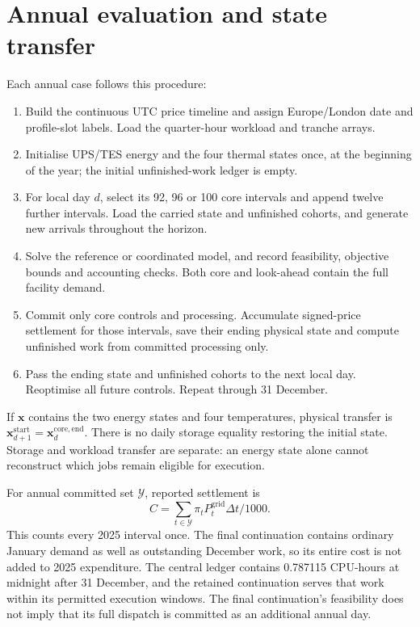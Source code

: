 \section{Annual evaluation and state transfer}
Each annual case follows this procedure:
\begin{enumerate}
\item Build the continuous UTC price timeline and assign Europe/London date and profile-slot labels. Load the quarter-hour workload and tranche arrays.
\item Initialise UPS/TES energy and the four thermal states once, at the beginning of the year; the initial unfinished-work ledger is empty.
\item For local day $d$, select its 92, 96 or 100 core intervals and append twelve further intervals. Load the carried state and unfinished cohorts, and generate new arrivals throughout the horizon.
\item Solve the reference or coordinated model, and record feasibility, objective bounds and accounting checks. Both core and look-ahead contain the full facility demand.
\item Commit only core controls and processing. Accumulate signed-price settlement for those intervals, save their ending physical state and compute unfinished work from committed processing only.
\item Pass the ending state and unfinished cohorts to the next local day. Reoptimise all future controls. Repeat through 31 December.
\end{enumerate}
If $\boldsymbol x$ contains the two energy states and four temperatures, physical transfer is $\boldsymbol x_{d+1}^{\mathrm{start}}=\boldsymbol x_d^{\mathrm{core,end}}$. There is no daily storage equality restoring the initial state. Storage and workload transfer are separate: an energy state alone cannot reconstruct which jobs remain eligible for execution.

For annual committed set $\mathcal Y$, reported settlement is
\begin{equation}
C=\sum_{t\in\mathcal Y}\pi_tP_t^{\mathrm{grid}}\Delta t/1000.
\end{equation}
This counts every 2025 interval once. The final continuation contains ordinary January demand as well as outstanding December work, so its entire cost is not added to 2025 expenditure. The central ledger contains 0.787115 CPU-hours at midnight after 31 December, and the retained continuation serves that work within its permitted execution windows. The final continuation's feasibility does not imply that its full dispatch is committed as an additional annual day.

